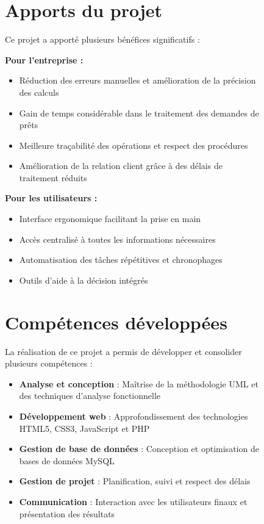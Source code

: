 \documentclass[12pt,a4paper]{report}
\begin{document}
\begin{figure}[H]
\section*{Apports du projet}

Ce projet a apporté plusieurs bénéfices significatifs :

\textbf{Pour l'entreprise :}
\begin{itemize}
    \item Réduction des erreurs manuelles et amélioration de la précision des calculs
    \item Gain de temps considérable dans le traitement des demandes de prêts
    \item Meilleure traçabilité des opérations et respect des procédures
    \item Amélioration de la relation client grâce à des délais de traitement réduits
\end{itemize}

\textbf{Pour les utilisateurs :}
\begin{itemize}
    \item Interface ergonomique facilitant la prise en main
    \item Accès centralisé à toutes les informations nécessaires
    \item Automatisation des tâches répétitives et chronophages
    \item Outils d'aide à la décision intégrés
\end{itemize}

\section*{Compétences développées}

La réalisation de ce projet a permis de développer et consolider plusieurs compétences :

\begin{itemize}
    \item \textbf{Analyse et conception} : Maîtrise de la méthodologie UML et des techniques d'analyse fonctionnelle
    \item \textbf{Développement web} : Approfondissement des technologies HTML5, CSS3, JavaScript et PHP
    \item \textbf{Gestion de base de données} : Conception et optimisation de bases de données MySQL
    \item \textbf{Gestion de projet} : Planification, suivi et respect des délais
    \item \textbf{Communication} : Interaction avec les utilisateurs finaux et présentation des résultats
\end{itemize}


\end{figure}
\end{document}
